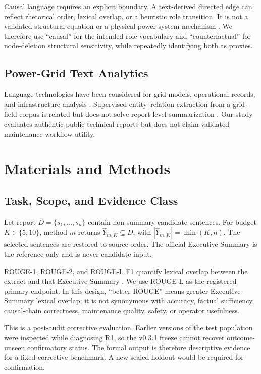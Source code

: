 \documentclass[applsci,article,submit,moreauthors]{Definitions/mdpi}
\begin{document}
Causal language requires an explicit boundary. A text-derived directed edge can reflect rhetorical order, lexical overlap, or a heuristic role transition. It is not a validated structural equation or a physical power-system mechanism \cite{feder2022causal}. We therefore use ``causal'' for the intended role vocabulary and ``counterfactual'' for node-deletion structural sensitivity, while repeatedly identifying both as proxies.

\subsection{Power-Grid Text Analytics}

Language technologies have been considered for grid models, operational records, and infrastructure analysis \cite{xie2022massively,hamann2024foundation,madabhushi2023survey,srinivasan2023artificial}. Supervised entity--relation extraction from a grid-field corpus is related but does not solve report-level summarization \cite{meng2023gridfield}. Our study evaluates authentic public technical reports but does not claim validated maintenance-workflow utility.

\section{Materials and Methods}

\subsection{Task, Scope, and Evidence Class}

Let report $D=\{s_1,\ldots,s_n\}$ contain non-summary candidate sentences. For budget $K\in\{5,10\}$, method $m$ returns $\hat{Y}_{m,K}\subseteq D$, with $|\hat{Y}_{m,K}|=\min(K,n)$. The selected sentences are restored to source order. The official Executive Summary is the reference only and is never candidate input.

ROUGE-1, ROUGE-2, and ROUGE-L F1 quantify lexical overlap between the extract and that Executive Summary \cite{lin2004rouge}. We use ROUGE-L as the registered primary endpoint. In this design, ``better ROUGE'' means greater Executive-Summary lexical overlap; it is not synonymous with accuracy, factual sufficiency, causal-chain correctness, maintenance quality, safety, or operator usefulness.

This is a post-audit corrective evaluation. Earlier versions of the test population were inspected while diagnosing R1, so the v0.3.1 freeze cannot recover outcome-unseen confirmatory status. The formal output is therefore descriptive evidence for a fixed corrective benchmark. A new sealed holdout would be required for confirmation.
\end{document}
